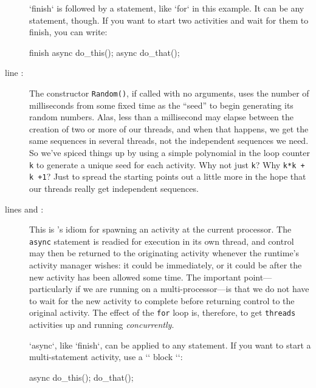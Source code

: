 \begin{description}
\xcd`finish` is followed by a statement, like \xcd`for` in this example.  It
can be any statement, though.  If you want to start two activities and wait
for them to finish, you can write: 

\begin{xtennum}[numbers=none]
      finish {
        async do_this();
        async do_that();
      }
\end{xtennum}


\item[line \xlref{mpia-r}{8}:]  The constructor {\tt Random()}, if called with no arguments,
uses the number of milliseconds from some fixed time as the ``seed'' to begin
generating its random numbers. Alas, less than a millisecond may elapse between
the creation of two or more of our threads, and when that happens, we get the
same sequences in several threads, not the independent sequences we need.
So we've spiced things up by using a simple
polynomial in the loop counter {\tt k} to generate a unique seed for each activity.
Why not just {\tt k}? Why {\tt k*k + k +1}?  Just to spread the starting points out
a little more in the hope that our threads really
get independent sequences.

\item[lines \xlref{mpia-kval}{10} and \xlref{mpia-async}{11}:]
This is \Xten's idiom for spawning an activity
at the current processor.
The {\tt async} statement is readied for execution in its own thread, and control
may then be returned to the originating activity whenever the \Xten{} runtime's
activity manager wishes: it could be immediately, or it could be after the new
activity has been allowed some time. The important point---particularly if we
are running on a multi-processor---is that we do not have
to wait for the new activity to complete before returning control to the
original activity.  The effect of the {\tt for} loop is, therefore, to get
{\tt threads} activities up and running {\em concurrently}.

\xcd`async`, like \xcd`finish`, can be applied to any statement.  If you want
to start a multi-statement activity, use a \xcd`{` block \xcd`}`: 

\begin{xtennum}[]
     async {
       do_this();
       do_that();
     }    
\end{xtennum}



\end{description}
